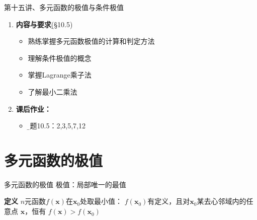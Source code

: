 
\begin{frame}{第十五讲、多元函数的极值与条件极值}
	\linespread{1.5}
	\begin{enumerate}
	  \item {\bf 内容与要求}{\b (\S10.5)}
	  \begin{itemize}
	    \item 熟练掌握多元函数极值的计算和判定方法
	    \item 理解条件极值的概念
	    \item 掌握Lagrange乘子法
	    \item 了解最小二乘法
	  \vspace{1em}
	  \end{itemize}
	  \item {\bf  课后作业：}
	  \begin{itemize}
	    \item {\b 习题10.5：2,3,5,7,12}
	  \end{itemize}
	\end{enumerate}
\end{frame}

\section{多元函数的极值}

\begin{frame}{多元函数的极值}
	\linespread{1.2}\pause 
	{\bb 极值：}局部唯一的最值\pause 
	\begin{block}{{\bf 定义}\hfill}
		{\bb $n$元函数$f(\bm{x})$在$\bm{x}_0$处取最小值：}
		$f(\bm{x}_0)$有定义，且对$\bm{x}_0$某去心邻域内的任意点
		$\bm{x}$，恒有
		$f(\bm{x})>f(\bm{x}_0)$
	\end{block}
	\pause
	{\begin{center}
	\end{center}}
\end{frame}

